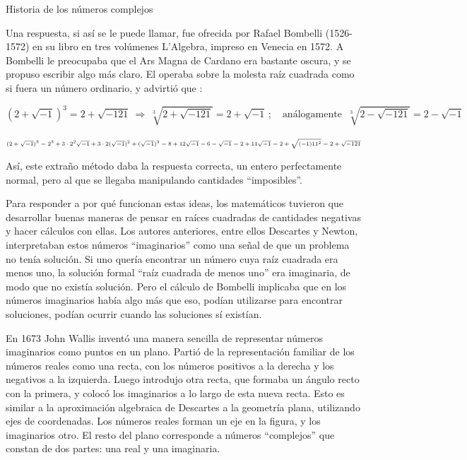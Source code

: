 \begin{myexampleblock}{Historia de los números complejos}
\begin{small}
\vspace{1mm} Una respuesta, si así se le puede llamar, fue ofrecida por Rafael Bombelli (1526-1572) en su libro en tres volúmenes L’Algebra, impreso en Venecia en 1572. A Bombelli le preocupaba que el Ars Magna de Cardano era bastante oscura, y se propuso escribir algo más claro. El operaba sobre la molesta raíz cuadrada como si fuera un número ordinario, y advirtió que :

$$(2+\sqrt{-1})^3=2+\sqrt{-121} \ \Rightarrow \ \sqrt[3]{2+\sqrt{-121}}=2+\sqrt{-1}\, ; \quad \text{análogamente } \ 
\sqrt[3]{2-\sqrt{-121}}=2-\sqrt{-1}$$


\textcolor{gris}{$\scriptsize{ 
\mqty{
(2+\sqrt{-1})^3=2^3+3\cdot 2^2 \sqrt{-1}+3\cdot 2 (\sqrt{-1})^2+(\sqrt{-1})^3=8+12\sqrt{-1}-6-\sqrt{-1} 
=2+11\sqrt{-1}=2+\sqrt{(-1)11^2}=2+\sqrt{-121} }
} $}


\vspace{3mm}Así, este extraño método daba la respuesta correcta, un entero perfectamente normal, pero al que se llegaba manipulando cantidades ``imposibles''.

\vspace{1mm} Para responder a por qué funcionan estas ideas, los matemáticos tuvieron que desarrollar buenas maneras de pensar en raíces cuadradas de cantidades negativas y hacer cálculos con ellas. Los autores anteriores, entre ellos Descartes y Newton, interpretaban estos números ``imaginarios'' como una señal de que un problema no tenía solución. Si uno quería encontrar un número cuya raíz cuadrada era menos uno, la solución formal ``raíz cuadrada de menos uno'' era imaginaria, de modo que no existía solución. Pero el cálculo de Bombelli implicaba que en los números imaginarios había algo más que eso, podían utilizarse para encontrar soluciones, podían ocurrir cuando las soluciones sí existían.

\vspace{1mm} En 1673 John Wallis inventó una manera sencilla de representar números imaginarios como puntos en un plano. Partió de la representación familiar de los números reales como una recta, con los números positivos a la derecha y los negativos a la izquierda. Luego introdujo otra recta, que formaba un ángulo recto con la primera, y colocó los imaginarios a lo largo de esta nueva recta. Esto es similar a la aproximación algebraica de Descartes a la geometría plana, utilizando ejes de coordenadas. Los números reales forman un eje en la figura, y los imaginarios otro. El resto del plano corresponde a números ``complejos'' que constan de dos partes: una real y una imaginaria.


\end{small}
\end{myexampleblock}
